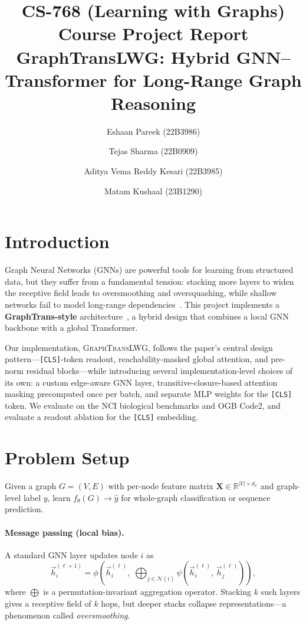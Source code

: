 \documentclass[11pt]{article}
\title{CS-768 (Learning with Graphs) Course Project Report\\\large GraphTransLWG: Hybrid GNN--Transformer for Long-Range Graph Reasoning}
\author{Eshaan Pareek (22B3986) \and Tejas Sharma (22B0909) \and Aditya Vema Reddy Kesari (22B3985) \and Matam Kushaal (23B1290)}
\date{}
\begin{document}
\maketitle

\section{Introduction}

Graph Neural Networks (GNNs) are powerful tools for learning from structured data, but they suffer from a fundamental tension: stacking more layers to widen the receptive field leads to oversmoothing and oversquashing, while shallow networks fail to model long-range dependencies~\cite{alon2021on}. This project implements a \textbf{GraphTrans-style} architecture~\cite{wu2022representinglongrangecontextgraph}, a hybrid design that combines a local GNN backbone with a global Transformer.

Our implementation, \textsc{GraphTransLWG}, follows the paper's central design pattern---\texttt{[CLS]}-token readout, reachability-masked global attention, and pre-norm residual blocks---while introducing several implementation-level choices of its own: a custom edge-aware GNN layer, transitive-closure-based attention masking precomputed once per batch, and separate MLP weights for the \texttt{[CLS]} token. We evaluate on the \textsf{NCI} biological benchmarks and \textsf{OGB Code2}, and evaluate a readout ablation for the \texttt{[CLS]} embedding.


\section{Problem Setup}

Given a graph $G=(V,E)$ with per-node feature matrix $\mathbf{X}\in\mathbb{R}^{|V|\times d_x}$ and graph-level label $y$, learn $f_\theta(G)\to\hat{y}$ for whole-graph classification or sequence prediction.

\paragraph{Message passing (local bias).}
A standard GNN layer updates node $i$ as
\[
\vec{h}^{(\ell+1)}_i = \phi\!\left(\vec{h}^{(\ell)}_i,\;
  \bigoplus_{j\in\mathcal{N}(i)} \psi\!\left(\vec{h}^{(\ell)}_i,\,\vec{h}^{(\ell)}_j\right)\right),
\]
where $\bigoplus$ is a permutation-invariant aggregation operator. Stacking $k$ such layers gives a receptive field of $k$ hops, but deeper stacks collapse representations---a phenomenon called \emph{oversmoothing}.
\end{document}
